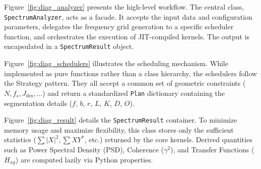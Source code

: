 \documentclass[final, 5p, times, twocolumn, number, sort&compress]{elsarticle}
\begin{document}
Figure~\ref{fig:diag_analyzer} presents the high-level workflow. The central class, \texttt{SpectrumAnalyzer}, acts as a facade. It accepts the input data and configuration parameters, delegates the frequency grid generation to a specific scheduler function, and orchestrates the execution of JIT-compiled kernels. The output is encapsulated in a \texttt{SpectrumResult} object.

Figure~\ref{fig:diag_schedulers} illustrates the scheduling mechanism. While implemented as pure functions rather than a class hierarchy, the schedulers follow the Strategy pattern. They all accept a common set of geometric constraints ($N, f_s, J_{\text{des}}, \dots$) and return a standardized \texttt{Plan} dictionary containing the segmentation details ($f$, $b$, $r$, $L$, $K$, $D$, $O$).

Figure~\ref{fig:diag_result} details the \texttt{SpectrumResult} container. To minimize memory usage and maximize flexibility, this class stores only the sufficient statistics ($\sum |X|^2, \sum XY^*$, etc.) returned by the core kernels. Derived quantities such as Power Spectral Density (PSD), Coherence ($\gamma^2$), and Transfer Functions ($H_{xy}$) are computed lazily via Python properties.
\end{document}
